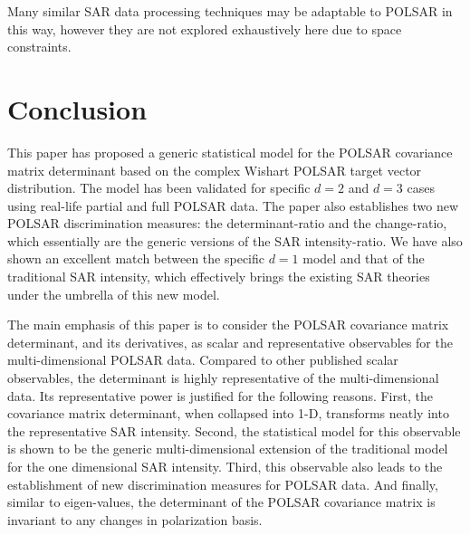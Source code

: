 \documentclass[journal]{IEEEtran}
\begin{document}
Many similar SAR data processing techniques may be adaptable to POLSAR in this way, however they are not explored exhaustively here due to space constraints.

\section{Conclusion}
\label{sec:conclusion}

This paper has proposed a generic statistical model  for the POLSAR covariance matrix determinant based on the complex Wishart POLSAR target vector distribution.
The model has been validated for specific $d=2$ and $d=3$ cases using real-life partial and full POLSAR data.
The paper also establishes two new POLSAR discrimination measures: the determinant-ratio and the change-ratio,  which essentially are the generic versions of the SAR intensity-ratio.
We have also shown an excellent match between the specific $d=1$ model and that of the traditional SAR intensity,
which effectively brings the existing SAR theories under the umbrella of this new model.

The main emphasis of this paper is to consider the POLSAR covariance matrix determinant, and its derivatives, as scalar and representative observables for the multi-dimensional POLSAR data.
Compared to other published scalar observables, the determinant is highly representative of the multi-dimensional data.
Its representative power is justified for the following reasons.
First, the covariance matrix determinant, when collapsed into 1-D, transforms neatly into the representative SAR intensity.
Second, the statistical model for this observable is shown to be the generic multi-dimensional extension of the traditional model for the one dimensional SAR intensity.
Third, this observable also leads to the establishment of new discrimination measures for POLSAR data.
And finally, similar to eigen-values, the determinant of the POLSAR covariance matrix is invariant to any changes in polarization basis.
\end{document}
